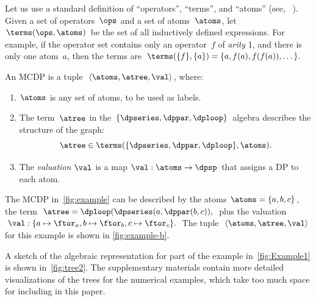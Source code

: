 Let us use a standard definition of ``operators'', ``terms'',
and ``atoms'' (see, \eg~\cite[p.41]{jezek08}). Given a set
of operators~$\ops$ and a set of atoms~$\atoms$, let~$\terms(\ops,\atoms)$
be the set of all inductively defined expressions. For example, if
the operator set contains only an operator~$f$ of \emph{arity} 1,
and there is only one atom~$a$, then the terms are $\terms(\{f\},\{a\})=\{a,f(a),f(f(a)),\dots\}.$



\begin{definition}
    \label{def:MCDP-algebraic}An MCDP is a tuple~$\left\langle \atoms,\atree,\val\right\rangle $,
    where:
    \begin{enumerate}
        \item $\atoms$ is any set of atoms, to be used as labels.
        \item The term~$\atree$ in the $\{\dpseries,\dppar,\dploop\}$ algebra
        describes the structure of the graph:
        \[
            \atree\in\terms(\{\dpseries,\dppar,\dploop\},\atoms).
        \]
        \item The \emph{valuation} $\val$ is a map $\val:\atoms\rightarrow\dpsp$
        that assigns a DP to each atom.
    \end{enumerate}
\end{definition}
\begin{example}
    The MCDP in~\cref{fig:example} can be described by the atoms
    $\atoms=\{a,b,c\}$, the term $\atree=\dploop(\dpseries(a,\dppar(b,c)),$
    plus the valuation $\val:\{a\mapsto\ftor_{a},b\mapsto\ftor_{b},c\mapsto\ftor_{c}\}.$
    The tuple~$\left\langle \atoms,\atree,\val\right\rangle $ for this
    example is shown in \cref{fig:example-b}.
\end{example}
\begin{example}
    A sketch of the algebraic representation for part of the example in~\cref{fig:Example1}
    is shown in~\cref{fig:tree2}. The supplementary materials contain
    more detailed visualizations of the trees for the numerical examples,
    which take too much space for including in this paper.
\end{example}
